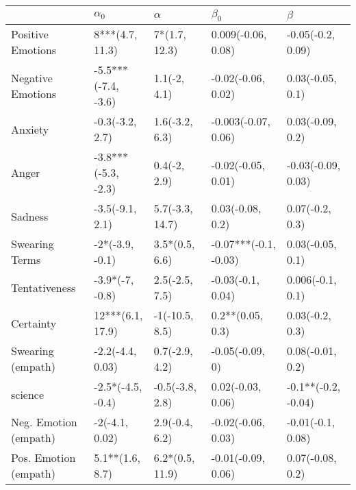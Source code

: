 \begin{tabular}{lllll}
\toprule
{} &           $\alpha_0$ &         $\alpha$ &              $\beta_0$ &              $\beta$ \\
\midrule
Positive Emotions     &      8***(4.7, 11.3) &    7*(1.7, 12.3) &     0.009(-0.06, 0.08) &    -0.05(-0.2, 0.09) \\
Negative Emotions     &  -5.5***(-7.4, -3.6) &     1.1(-2, 4.1) &     -0.02(-0.06, 0.02) &     0.03(-0.05, 0.1) \\
Anxiety               &      -0.3(-3.2, 2.7) &   1.6(-3.2, 6.3) &    -0.003(-0.07, 0.06) &     0.03(-0.09, 0.2) \\
Anger                 &  -3.8***(-5.3, -2.3) &     0.4(-2, 2.9) &     -0.02(-0.05, 0.01) &   -0.03(-0.09, 0.03) \\
Sadness               &      -3.5(-9.1, 2.1) &  5.7(-3.3, 14.7) &       0.03(-0.08, 0.2) &      0.07(-0.2, 0.3) \\
Swearing Terms        &      -2*(-3.9, -0.1) &   3.5*(0.5, 6.6) &  -0.07***(-0.1, -0.03) &     0.03(-0.05, 0.1) \\
Tentativeness         &      -3.9*(-7, -0.8) &   2.5(-2.5, 7.5) &      -0.03(-0.1, 0.04) &     0.006(-0.1, 0.1) \\
Certainty             &     12***(6.1, 17.9) &   -1(-10.5, 8.5) &       0.2**(0.05, 0.3) &      0.03(-0.2, 0.3) \\
Swearing (empath)     &     -2.2(-4.4, 0.03) &   0.7(-2.9, 4.2) &        -0.05(-0.09, 0) &     0.08(-0.01, 0.2) \\
science               &    -2.5*(-4.5, -0.4) &  -0.5(-3.8, 2.8) &      0.02(-0.03, 0.06) &  -0.1**(-0.2, -0.04) \\
Neg. Emotion (empath) &       -2(-4.1, 0.02) &   2.9(-0.4, 6.2) &     -0.02(-0.06, 0.03) &    -0.01(-0.1, 0.08) \\
Pos. Emotion (empath) &      5.1**(1.6, 8.7) &  6.2*(0.5, 11.9) &     -0.01(-0.09, 0.06) &     0.07(-0.08, 0.2) \\
\bottomrule
\end{tabular}

